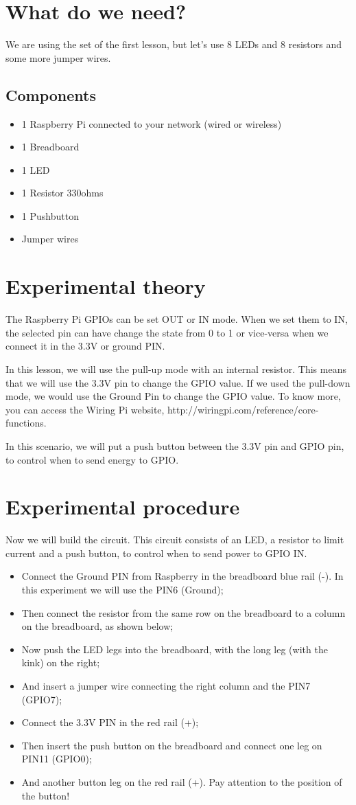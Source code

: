 \documentclass[10pt,twoside,english]{_support/latex/sbabook/sbabook}
\begin{document}
\section{What do we need?}
We are using the set of the first lesson, but let's use 8 LEDs and 8 resistors and some more jumper wires.
\subsection{Components}
\begin{itemize}
\item 1 Raspberry Pi connected to your network (wired or wireless)
\item 1 Breadboard
\item 1 LED
\item 1 Resistor 330ohms
\item 1 Pushbutton
\item Jumper wires
\end{itemize}
\section{Experimental theory}
The Raspberry Pi GPIOs can be set OUT or IN mode. When we set them to IN, the selected pin can have change the state from 0 to 1 or vice-versa when we connect it in the 3.3V or ground PIN.

In this lesson, we will use the pull-up mode with an internal resistor. This means that we will use the 3.3V pin to change the GPIO value. If we used the pull-down mode, we would use the Ground Pin to change the GPIO value. To know more, you can access the Wiring Pi website, http://wiringpi.com/reference/core-functions.

In this scenario, we will put a push button between the 3.3V pin and GPIO pin, to control when to send energy to GPIO.
\section{Experimental procedure}
Now we will build the circuit. This circuit consists of an LED, a resistor to limit current and a push button, to control when to send power to GPIO IN.  

\begin{itemize}
\item Connect the Ground PIN from Raspberry in the breadboard blue rail (-). In this experiment we will use the PIN6 (Ground);
\item Then connect the resistor from the same row on the breadboard to a column on the breadboard, as shown below;
\item Now push the LED legs into the breadboard, with the long leg (with the kink) on the right;
\item And insert a jumper wire connecting the right column and the PIN7 (GPIO7);
\item Connect the 3.3V PIN in the red rail (+);
\item Then insert the push button on the breadboard and connect one leg on PIN11 (GPIO0);
\item And another button leg on the red rail (+). Pay attention to the position of the button!
\end{itemize}
\end{document}
